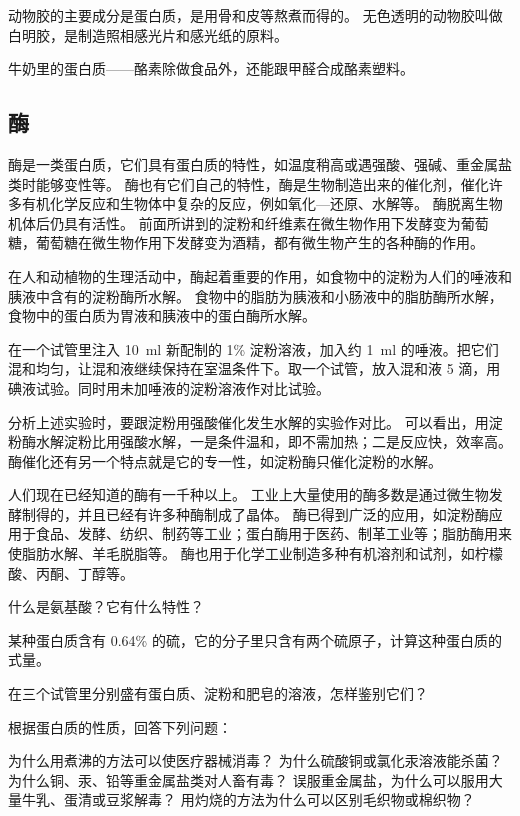 动物胶的主要成分是蛋白质，是用骨和皮等熬煮而得的。
无色透明的动物胶叫做白明胶，是制造照相感光片和感光纸的原料。

牛奶里的蛋白质——酪素除做食品外，还能跟甲醛合成酪素塑料。

\subsection{酶}
酶是一类蛋白质，它们具有蛋白质的特性，如温度稍高或遇强酸、强碱、重金属盐类时能够变性等。
酶也有它们自己的特性，酶是生物制造出来的催化剂，催化许多有机化学反应和生物体中复杂的反应，例如氧化—还原、水解等。
酶脱离生物机体后仍具有活性。
前面所讲到的淀粉和纤维素在微生物作用下发酵变为葡萄糖，葡萄糖在微生物作用下发酵变为酒精，都有微生物产生的各种酶的作用。

在人和动植物的生理活动中，酶起着重要的作用，如食物中的淀粉为人们的唾液和胰液中含有的淀粉酶所水解。
食物中的脂肪为胰液和小肠液中的脂肪酶所水解，食物中的蛋白质为胃液和胰液中的蛋白酶所水解。
\begin{Experiment}
在一个试管里注入 \qty{10}{ml} 新配制的 1\% 淀粉溶液，加入约 \qty{1}{ml} 的唾液。把它们混和均匀，让混和液继续保持在室温条件下。取一个试管，放入混和液 5 滴，用碘液试验。同时用未加唾液的淀粉溶液作对比试验。
\end{Experiment}

分析上述实验时，要跟淀粉用强酸催化发生水解的实验作对比。
可以看出，用淀粉酶水解淀粉比用强酸水解，一是条件温和，即不需加热；二是反应快，效率高。
酶催化还有另一个特点就是它的专一性，如淀粉酶只催化淀粉的水解。

人们现在已经知道的酶有一千种以上。
工业上大量使用的酶多数是通过微生物发酵制得的，并且已经有许多种酶制成了晶体。
酶已得到广泛的应用，如淀粉酶应用于食品、发酵、纺织、制药等工业；蛋白酶用于医药、制革工业等；脂肪酶用来使脂肪水解、羊毛脱脂等。
酶也用于化学工业制造多种有机溶剂和试剂，如柠檬酸、丙酮、丁醇等。

\begin{Practice}[习题]
\begin{question}
  \item 什么是氨基酸？它有什么特性？
  \item 某种蛋白质含有 0.64\% 的硫，它的分子里只含有两个硫原子，计算这种蛋白质的式量。
  \item 在三个试管里分别盛有蛋白质、淀粉和肥皂的溶液，怎样鉴别它们？
  \item 根据蛋白质的性质，回答下列问题：
  \begin{tasks}[label=(\arabic*)]
    \task 为什么用煮沸的方法可以使医疗器械消毒？
    \task 为什么硫酸铜或氯化汞溶液能杀菌？
    \task 为什么铜、汞、铅等重金属盐类对人畜有毒？
    \task 误服重金属盐，为什么可以服用大量牛乳、蛋清或豆浆解毒？
    \task 用灼烧的方法为什么可以区别毛织物或棉织物？
  \end{tasks}
\end{question}
\end{Practice}

